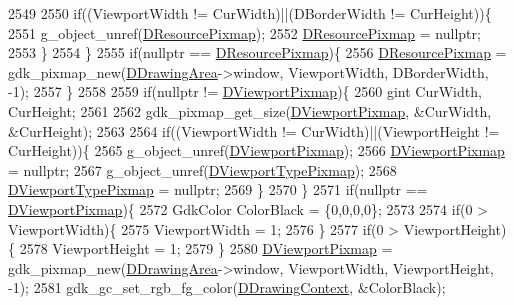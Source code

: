 \begin{DoxyCode}
{2549         
2550         \textcolor{keywordflow}{if}((ViewportWidth != CurWidth)||(DBorderWidth != CurHeight))\{
2551             g\_object\_unref(\hyperlink{classCApplicationData_aa9faf270fb2d769855fa5d787a883a83}{DResourcePixmap});
2552             \hyperlink{classCApplicationData_aa9faf270fb2d769855fa5d787a883a83}{DResourcePixmap} = \textcolor{keyword}{nullptr};
2553         \}  
2554     \}
2555     \textcolor{keywordflow}{if}(\textcolor{keyword}{nullptr} == \hyperlink{classCApplicationData_aa9faf270fb2d769855fa5d787a883a83}{DResourcePixmap})\{
2556         \hyperlink{classCApplicationData_aa9faf270fb2d769855fa5d787a883a83}{DResourcePixmap} = gdk\_pixmap\_new(\hyperlink{classCApplicationData_a4735f5d31632313e0b2a1659eb178987}{DDrawingArea}->window, ViewportWidth, 
      DBorderWidth, -1);
2557     \}
2558     
2559     \textcolor{keywordflow}{if}(\textcolor{keyword}{nullptr} != \hyperlink{classCApplicationData_ac8801e116d0c49776c9f3db7415287fe}{DViewportPixmap})\{
2560         gint CurWidth, CurHeight;
2561         
2562         gdk\_pixmap\_get\_size(\hyperlink{classCApplicationData_ac8801e116d0c49776c9f3db7415287fe}{DViewportPixmap}, &CurWidth, &CurHeight); 
2563         
2564         \textcolor{keywordflow}{if}((ViewportWidth != CurWidth)||(ViewportHeight != CurHeight))\{
2565             g\_object\_unref(\hyperlink{classCApplicationData_ac8801e116d0c49776c9f3db7415287fe}{DViewportPixmap});
2566             \hyperlink{classCApplicationData_ac8801e116d0c49776c9f3db7415287fe}{DViewportPixmap} = \textcolor{keyword}{nullptr};
2567             g\_object\_unref(\hyperlink{classCApplicationData_a3a71a311e7bf0d4a002412343f69e794}{DViewportTypePixmap});
2568             \hyperlink{classCApplicationData_a3a71a311e7bf0d4a002412343f69e794}{DViewportTypePixmap} = \textcolor{keyword}{nullptr};
2569         \}
2570     \}
2571     \textcolor{keywordflow}{if}(\textcolor{keyword}{nullptr} == \hyperlink{classCApplicationData_ac8801e116d0c49776c9f3db7415287fe}{DViewportPixmap})\{
2572         GdkColor ColorBlack = \{0,0,0,0\};
2573         
2574         \textcolor{keywordflow}{if}(0 > ViewportWidth)\{
2575             ViewportWidth = 1;   
2576         \}
2577         \textcolor{keywordflow}{if}(0 > ViewportHeight)\{
2578             ViewportHeight = 1;   
2579         \}
2580         \hyperlink{classCApplicationData_ac8801e116d0c49776c9f3db7415287fe}{DViewportPixmap} = gdk\_pixmap\_new(\hyperlink{classCApplicationData_a4735f5d31632313e0b2a1659eb178987}{DDrawingArea}->window, ViewportWidth, 
      ViewportHeight, -1);
2581         gdk\_gc\_set\_rgb\_fg\_color(\hyperlink{classCApplicationData_aa6c5bea9bdcc64398e5a3f693661d37c}{DDrawingContext}, &ColorBlack);
}
\end{DoxyCode}
